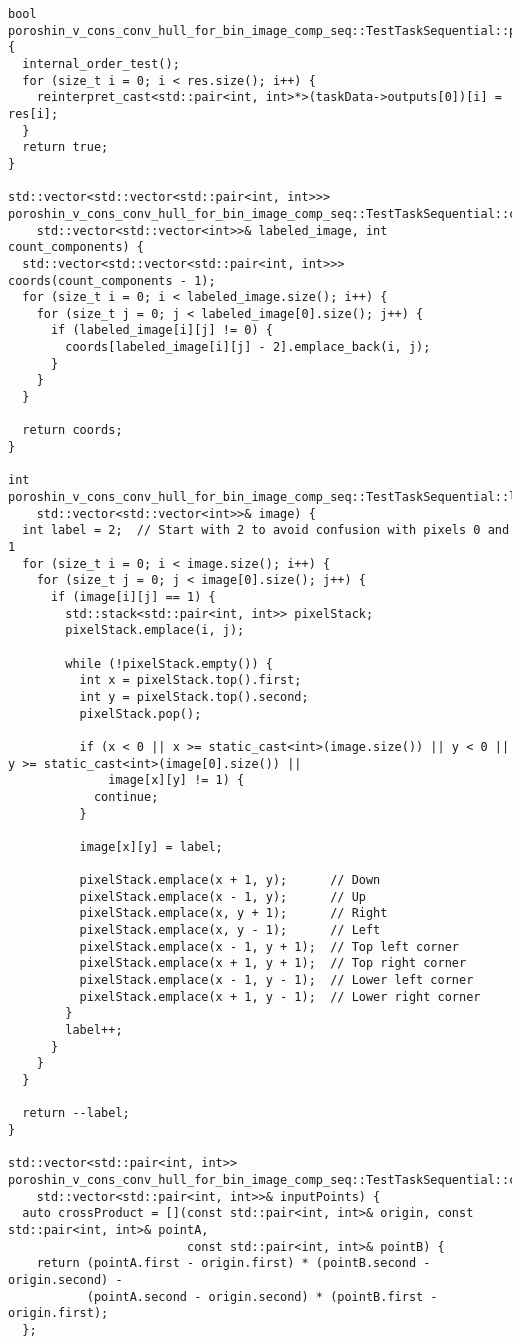 \documentclass[12pt]{article}
\begin{document}
\begin{verbatim}
bool poroshin_v_cons_conv_hull_for_bin_image_comp_seq::TestTaskSequential::post_processing() {
  internal_order_test();
  for (size_t i = 0; i < res.size(); i++) {
    reinterpret_cast<std::pair<int, int>*>(taskData->outputs[0])[i] = res[i];
  }
  return true;
}

std::vector<std::vector<std::pair<int, int>>>
poroshin_v_cons_conv_hull_for_bin_image_comp_seq::TestTaskSequential::coordinates_connected_components(
    std::vector<std::vector<int>>& labeled_image, int count_components) {
  std::vector<std::vector<std::pair<int, int>>> coords(count_components - 1);
  for (size_t i = 0; i < labeled_image.size(); i++) {
    for (size_t j = 0; j < labeled_image[0].size(); j++) {
      if (labeled_image[i][j] != 0) {
        coords[labeled_image[i][j] - 2].emplace_back(i, j);
      }
    }
  }

  return coords;
}

int poroshin_v_cons_conv_hull_for_bin_image_comp_seq::TestTaskSequential::label_connected_components(
    std::vector<std::vector<int>>& image) {
  int label = 2;  // Start with 2 to avoid confusion with pixels 0 and 1
  for (size_t i = 0; i < image.size(); i++) {
    for (size_t j = 0; j < image[0].size(); j++) {
      if (image[i][j] == 1) {
        std::stack<std::pair<int, int>> pixelStack;
        pixelStack.emplace(i, j);

        while (!pixelStack.empty()) {
          int x = pixelStack.top().first;
          int y = pixelStack.top().second;
          pixelStack.pop();

          if (x < 0 || x >= static_cast<int>(image.size()) || y < 0 || y >= static_cast<int>(image[0].size()) ||
              image[x][y] != 1) {
            continue;
          }

          image[x][y] = label;

          pixelStack.emplace(x + 1, y);      // Down
          pixelStack.emplace(x - 1, y);      // Up
          pixelStack.emplace(x, y + 1);      // Right
          pixelStack.emplace(x, y - 1);      // Left
          pixelStack.emplace(x - 1, y + 1);  // Top left corner
          pixelStack.emplace(x + 1, y + 1);  // Top right corner
          pixelStack.emplace(x - 1, y - 1);  // Lower left corner
          pixelStack.emplace(x + 1, y - 1);  // Lower right corner
        }
        label++;
      }
    }
  }

  return --label;
}

std::vector<std::pair<int, int>> poroshin_v_cons_conv_hull_for_bin_image_comp_seq::TestTaskSequential::convex_hull(
    std::vector<std::pair<int, int>>& inputPoints) {
  auto crossProduct = [](const std::pair<int, int>& origin, const std::pair<int, int>& pointA,
                         const std::pair<int, int>& pointB) {
    return (pointA.first - origin.first) * (pointB.second - origin.second) -
           (pointA.second - origin.second) * (pointB.first - origin.first);
  };


\end{verbatim}
\end{document}
